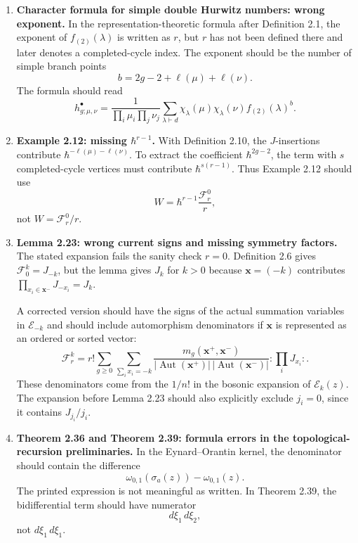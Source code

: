 \documentclass[11pt]{article}
\newcommand{\Aut}{\operatorname{Aut}}
\begin{document}
\begin{enumerate}[label=\textbf{\arabic*.}]
   \item \textbf{Character formula for simple double Hurwitz numbers: wrong exponent.}
   In the representation-theoretic formula after Definition 2.1, the exponent of $f_{(2)}(\lambda)$ is written as $r$, but $r$ has not been defined there and later denotes a completed-cycle index.  The exponent should be the number of simple branch points
   \[
      b=2g-2+\ell(\mu)+\ell(\nu).
   \]
   The formula should read
   \[
      h^\bullet_{g;\mu,\nu}
      =
      \frac{1}{\prod_i\mu_i\prod_j\nu_j}
      \sum_{\lambda\vdash d}
      \chi_\lambda(\mu)\chi_\lambda(\nu)f_{(2)}(\lambda)^b.
   \]

   \item \textbf{Example 2.12: missing $\hbar^{r-1}$.}
   With Definition 2.10, the $J$-insertions contribute $\hbar^{-\ell(\mu)-\ell(\nu)}$.  To extract the coefficient $\hbar^{2g-2}$, the term with $s$ completed-cycle vertices must contribute $\hbar^{s(r-1)}$.  Thus Example 2.12 should use
   \[
      W=\hbar^{r-1}\frac{\mathcal F_r^0}{r},
   \]
   not $W=\mathcal F_r^0/r$.

   \item \textbf{Lemma 2.23: wrong current signs and missing symmetry factors.}
   The stated expansion fails the sanity check $r=0$.  Definition 2.6 gives $\mathcal F_0^k=J_{-k}$, but the lemma gives $J_k$ for $k>0$ because $\mathbf x=(-k)$ contributes $\prod_{x_i\in\mathbf x^-}J_{-x_i}=J_k$.

   A corrected version should have the signs of the actual summation variables in $\mathcal E_{-k}$ and should include automorphism denominators if $\mathbf x$ is represented as an ordered or sorted vector:
   \[
      \mathcal F_r^k
      =
      r!\sum_{g\ge0}
      \sum_{\sum_i x_i=-k}
      \frac{m_g(\mathbf x^+,\mathbf x^-)}
      {|\Aut(\mathbf x^+)|\,|\Aut(\mathbf x^-)|}
      :\prod_i J_{x_i}: .
   \]
   These denominators come from the $1/n!$ in the bosonic expansion of $\mathcal E_k(z)$.  The expansion before Lemma 2.23 should also explicitly exclude $j_i=0$, since it contains $J_{j_i}/j_i$.

   \item \textbf{Theorem 2.36 and Theorem 2.39: formula errors in the topological-recursion preliminaries.}
   In the Eynard--Orantin kernel, the denominator should contain the difference
   \[
      \omega_{0,1}(\sigma_a(z))-\omega_{0,1}(z).
   \]
   The printed expression is not meaningful as written.  In Theorem 2.39, the bidifferential term should have numerator
   \[
      d\xi_1\,d\xi_2,
   \]
   not $d\xi_1\,d\xi_1$.


\end{enumerate}
\end{document}

